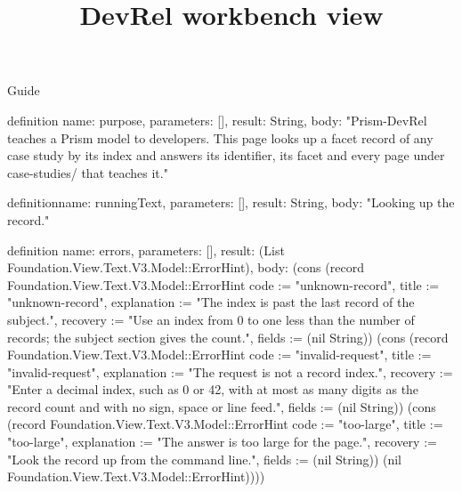 \begin{lexlean}{Guide}
\title{DevRel workbench view}
\begin{semanticmodule}
definition{
  name: purpose,
  parameters: [],
  result: String,
  body: "Prism-DevRel teaches a Prism model to developers. This page looks up a facet record of any case study by its index and answers its identifier, its facet and every page under case-studies/ that teaches it."
}

definition{name: runningText, parameters: [], result: String, body: "Looking up the record."}

definition{
  name: errors,
  parameters: [],
  result: (List Foundation.View.Text.V3.Model::ErrorHint),
  body: (cons (record Foundation.View.Text.V3.Model::ErrorHint {code := "unknown-record", title := "unknown-record", explanation := "The index is past the last record of the subject.", recovery := "Use an index from 0 to one less than the number of records; the subject section gives the count.", fields := (nil String)}) (cons (record Foundation.View.Text.V3.Model::ErrorHint {code := "invalid-request", title := "invalid-request", explanation := "The request is not a record index.", recovery := "Enter a decimal index, such as 0 or 42, with at most as many digits as the record count and with no sign, space or line feed.", fields := (nil String)}) (cons (record Foundation.View.Text.V3.Model::ErrorHint {code := "too-large", title := "too-large", explanation := "The answer is too large for the page.", recovery := "Look the record up from the command line.", fields := (nil String)}) (nil Foundation.View.Text.V3.Model::ErrorHint))))
}


\end{semanticmodule}
\end{lexlean}
